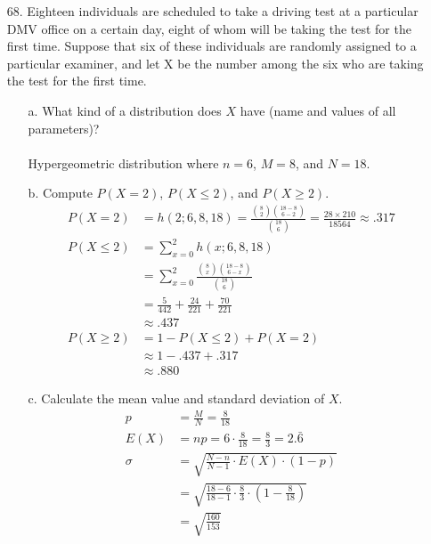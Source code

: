 \documentclass[letterpaper,12pt]{article}
\newcommand{\hg}[4]{%
  \frac%
    {\binom{#3}{#1} \binom{#4 - #3}{#2 - #1}}%
    {\binom{#4}{#2}}%
}
\newcommand{\hgeq}[4]{%
  h(#1; #2, #3, #4) = \hg{#1}{#2}{#3}{#4}%
}
\begin{document}
\maketitle

\begin{enumerate}
  \item[68.]
    Eighteen individuals are scheduled to take a driving test at a particular DMV office on a certain day, eight of whom will be taking the test for the first time. Suppose that six of these individuals are randomly assigned to a particular examiner, and let X be the number among the six who are taking the test for the first time.
    \begin{enumerate}
      \item[a.]
        What kind of a distribution does $X$ have (name and values of all parameters)?
        \\ \\
        Hypergeometric distribution where $n = 6$, $M = 8$, and $N = 18$.
      \item[b.]
        Compute $P(X = 2)$, $P(X \le 2)$, and $P(X \ge 2)$.
        \begin{align*}
          P(X = 2) &= \hgeq{2}{6}{8}{18} = \frac{28 \times 210}{18564} \approx .317 \\
          P(X \le 2) &= \sum_{x = 0}^{2} h(x; 6, 8, 18) \\
          &= \sum_{x = 0}^{2} \hg{x}{6}{8}{18} \\
          &= \frac{5}{442} + \frac{24}{221} + \frac{70}{221} \\
          &\approx .437 \\
          P(X \ge 2) &= 1 - P(X \le 2) + P(X = 2) \\
          &\approx 1 - .437 + .317 \\
          &\approx .880
        \end{align*}
      \item[c.]
        Calculate the mean value and standard deviation of $X$.
        \begin{align*}
          p &= \frac{M}{N} = \frac{8}{18} \\
          E(X) &= np = 6 \cdot \frac{8}{18} = \frac{8}{3} = 2.\bar{6} \\
          \sigma &= \sqrt{\frac{N - n}{N - 1} \cdot E(X) \cdot (1 - p)} \\
          &= \sqrt{\frac{18 - 6}{18 - 1} \cdot \frac{8}{3} \cdot \left(1 - \frac{8}{18}\right)} \\
          &= \sqrt{\frac{160}{153}} \\

\end{align*}
\end{enumerate}
\end{enumerate}
\end{document}
